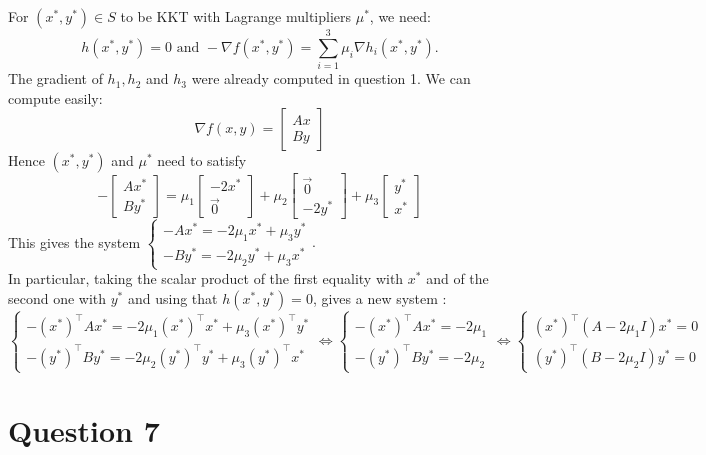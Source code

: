 \documentclass{article}
\begin{document}
\noindent For $ (x^*,y^*)\in S$ to be KKT with Lagrange multipliers $\mu^*$, we need: $$h(x^*,y^*)=0 \text{ and }-\nabla f(x^*,y^*)=\sum_{i=1}^3\mu_i\nabla h_i (x^*,y^*).$$
The gradient of $h_1,h_2$ and $h_3$ were already computed in question 1. We can compute easily:
$$\nabla f(x,y) =\begin{bmatrix}
Ax \\ By
\end{bmatrix}$$
Hence $(x^*,y^*)$ and $\mu^*$ need to satisfy
$$-\begin{bmatrix}Ax^* \\ By^*\end{bmatrix}
= \mu_1 \begin{bmatrix} -2x^*\\ \vec 0 \end{bmatrix} + \mu_2 \begin{bmatrix} \vec 0\\ -2y^* \end{bmatrix}+\mu_3 \begin{bmatrix} y^*\\ x^* \end{bmatrix}
$$
This gives the system $\begin{cases} -Ax^* = -2\mu_1 x^* +\mu_3 y^* \\
-By^* = -2\mu_2 y^* +\mu_3 x^*\end{cases}.$ \\
In particular, taking the scalar product of the first equality with $x^*$ and of the second one with $y^*$ and using that $h(x^*, y^*)=0$, gives a new system : 
$$\begin{cases} -(x^*)^\top Ax^* = -2\mu_1 (x^*)^\top x^* +\mu_3 (x^*)^\top y^* \\
-(y^*)^\top By^* = -2\mu_2(y^*)^\top y^* +\mu_3(y^*)^\top x^*\end{cases}
\iff 
\begin{cases} -(x^*)^\top Ax^* = -2\mu_1\\
-(y^*)^\top By^* = -2\mu_2\end{cases}
\iff 
\begin{cases} (x^*)^\top (A -2\mu_1 I)x^* = 0\\
(y^*)^\top (B-2\mu_2 I)y^* =0 \end{cases}
$$



\section*{Question 7}
\end{document}
